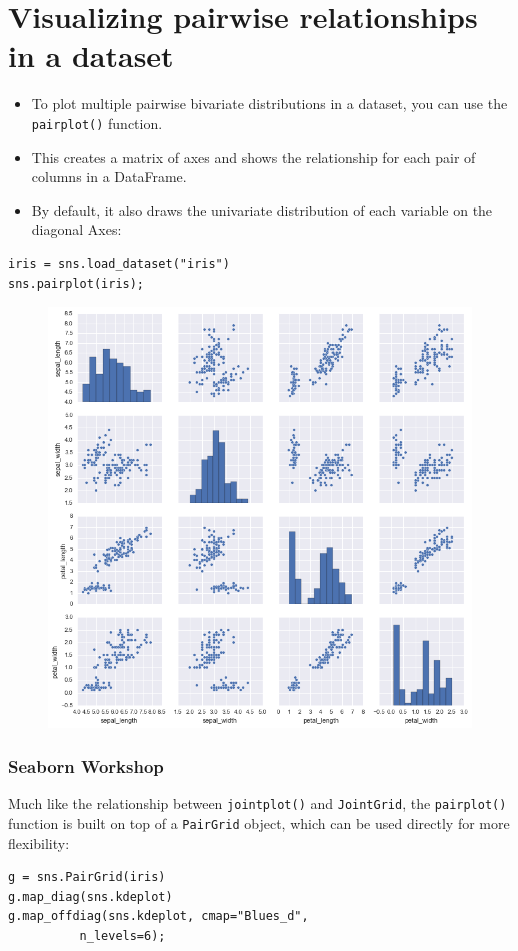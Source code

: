 \documentclass{beamer}
\begin{document}
\section{Visualizing pairwise relationships in a dataset}
\begin{frame}[fragile]
	\Large
\begin{itemize}
\item To plot multiple pairwise bivariate distributions in a dataset, you can use the \texttt{pairplot()} function.
\item  This creates a matrix of axes and shows the relationship for each pair of columns in a DataFrame. 
\item By default, it also draws the univariate distribution of each variable on the diagonal Axes:
\end{itemize}
\begin{verbatim}
iris = sns.load_dataset("iris")
sns.pairplot(iris);
\end{verbatim}
\end{frame}
\begin{frame}
\begin{figure}
\centering
\includegraphics[width=0.8\linewidth]{images/distributions_42_0}
\caption{}
\label{fig:distributions_42_0}
\end{figure}

\end{frame}
\begin{frame}[fragile]
	\frametitle{Seaborn Workshop}
	\large
Much like the relationship between \texttt{jointplot()} and \texttt{JointGrid}, the \texttt{pairplot()} function is built on top of a \texttt{PairGrid} object, which can be used directly for more flexibility:
\begin{framed}
\begin{verbatim}
g = sns.PairGrid(iris)
g.map_diag(sns.kdeplot)
g.map_offdiag(sns.kdeplot, cmap="Blues_d", 
          n_levels=6);
\end{verbatim}
\end{framed}
\end{frame}
\end{document}
